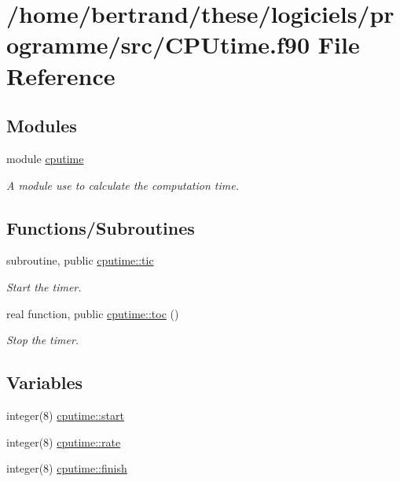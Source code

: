 \hypertarget{_c_p_utime_8f90}{}\section{/home/bertrand/these/logiciels/programme/src/\+C\+P\+Utime.f90 File Reference}
\label{_c_p_utime_8f90}
\subsection*{Modules}
\begin{DoxyCompactItemize}
\item 
module \hyperlink{namespacecputime}{cputime}
\begin{DoxyCompactList}\small\item\em A module use to calculate the computation time. \end{DoxyCompactList}\end{DoxyCompactItemize}
\subsection*{Functions/\+Subroutines}
\begin{DoxyCompactItemize}
\item 
subroutine, public \hyperlink{namespacecputime_a8ddcbcba17e66ece6b29c63b69753684}{cputime\+::tic}
\begin{DoxyCompactList}\small\item\em Start the timer. \end{DoxyCompactList}\item 
real function, public \hyperlink{namespacecputime_a6c69d406a4397d16ea918e4eb035fde9}{cputime\+::toc} ()
\begin{DoxyCompactList}\small\item\em Stop the timer. \end{DoxyCompactList}\end{DoxyCompactItemize}
\subsection*{Variables}
\begin{DoxyCompactItemize}
\item 
integer(8) \hyperlink{namespacecputime_a3c944d7fc4487f41daf6348bf28b1598}{cputime\+::start}
\item 
integer(8) \hyperlink{namespacecputime_a7648112eab2c70c19434f100a9599633}{cputime\+::rate}
\item 
integer(8) \hyperlink{namespacecputime_ad2d439f12d6051a89b5ba23d52aa3e4f}{cputime\+::finish}
\end{DoxyCompactItemize}

